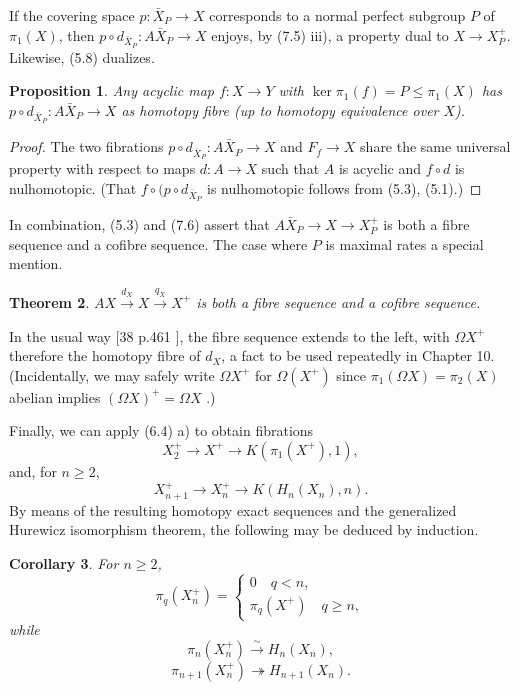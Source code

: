 \documentclass[openany,leqno]{book}  %
\newtheorem{theorem}{Theorem}[chapter]
\newtheorem{prop}[theorem]{Proposition}
\newtheorem{corollary}[theorem]{Corollary}
\begin{document}
If the covering space $p \colon   \bar{X}_P \longrightarrow  X$ corresponds to a normal perfect subgroup $P$ of $\pi_1(X)$, then
$p \circ  d_{\bar{X}_P}\colon   A\bar{X}_P\longrightarrow X$ enjoys, by (7.5) iii), a property dual to $X \longrightarrow  X_P^+$. Likewise, (5.8) dualizes.
\begin{prop}
  Any acyclic map $f\colon  X\longrightarrow Y$ with $\ker\pi_1(f) = P\leqslant \pi_1(X)$ has
$p \circ  d_{\bar{X}_P}\colon   A\bar{X}_P\longrightarrow X$ as homotopy fibre (up to homotopy equivalence over $X$).
\end{prop}
\begin{proof}
The two fibrations $p \circ  d_{\bar{X}_P}\colon   A\bar{X}_P\longrightarrow X$ and $F_f\longrightarrow X$ share the same universal property with respect to maps $d \colon   A \longrightarrow X$ such that $A$ is acyclic and $f\circ d$ is nulhomotopic. (That $f\circ (p\circ d_{\bar{X}_P}$ is nulhomotopic follows from (5.3), (5.1).)
\end{proof}
In combination, (5.3) and (7.6) assert that $A\bar{X}_P \longrightarrow X \rightarrow  X_P^+$ is both a fibre sequence and a cofibre sequence. The case where $P$ is maximal rates a special mention.
\begin{theorem}
$AX \overset{d_X}{\longrightarrow} X \overset{q_X}{\longrightarrow} X^+$ is both a fibre sequence and a cofibre sequence.
\end{theorem}
In the usual way [38 p.461 ], the fibre sequence extends to the left, with $\Omega X^+$ therefore the homotopy fibre of $d_X$, a fact to be used repeatedly in Chapter 10. (Incidentally, we may safely write $\Omega X^+$ for $\Omega(X^+)$ since $\pi_1(\Omega X) = \pi_2(X)$ abelian implies $(\Omega X)^+ = \Omega X$ .)

Finally, we can apply (6.4) a) to obtain fibrations
\[X_2^+\longrightarrow X^+ \longrightarrow K(\pi_1(X^+), 1),\]
 and, for $n \geqslant 2$,
 \[X_{n+1}^+\longrightarrow X_n^+ \longrightarrow K(H_n(X_n), n).\]
By means of the resulting homotopy exact sequences and the generalized Hurewicz isomorphism theorem, the following may be deduced by induction.
\begin{corollary}
 	For $n \geqslant 2$,
\begin{equation*}
\pi_q(X_n^+)=
  \begin{cases}
0 \quad q<n, \\
\pi_q(X^+) \quad q\geqslant n,
\end{cases}
\end{equation*}
while
\[\pi_n(X_n^+)\overset{\sim}{\longrightarrow} H_n(X_n),\]
\[\pi_{n+1}(X_n^+)\twoheadrightarrow H_{n+1}(X_n).\]
 \end{corollary} 
\end{document}
